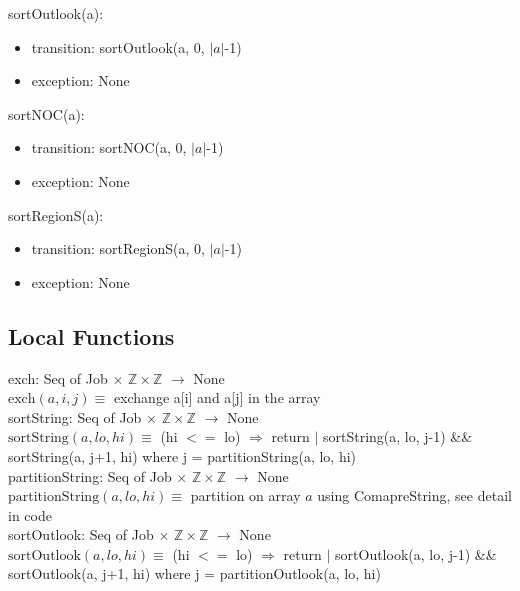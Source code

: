 \documentclass[12pt]{article}
\begin{document}
\noindent sortOutlook(a):
\begin{itemize}
\item transition: sortOutlook(a, 0, $|a|$-1)
\item exception: None
\end{itemize}

\noindent sortNOC(a):
\begin{itemize}
\item transition: sortNOC(a, 0, $|a|$-1)
\item exception: None
\end{itemize}

\noindent sortRegionS(a):
\begin{itemize}
\item transition: sortRegionS(a, 0, $|a|$-1)
\item exception: None
\end{itemize}

\subsection*{Local Functions}

\noindent exch: Seq of Job $\times$ $\mathbb{Z} \times \mathbb{Z}$  $ \rightarrow $ None\\
\noindent $\mbox{exch}(a, i, j) \equiv$ exchange a[i] and a[j] in the array\\

\noindent sortString: Seq of Job $\times$ $\mathbb{Z} \times \mathbb{Z}$ $ \rightarrow $ None\\
\noindent $\mbox{sortString}(a, lo, hi) \equiv$ (hi $<=$ lo) $\Rightarrow$ return $|$ sortString(a, lo, j-1) \&\& sortString(a, j+1, hi) where j = partitionString(a, lo, hi)\\

\noindent partitionString: Seq of Job $\times$ $\mathbb{Z} \times \mathbb{Z}$ $ \rightarrow $ None\\
\noindent $\mbox{partitionString}(a, lo, hi) \equiv$ partition on array $a$ using ComapreString, see detail in code\\

\noindent sortOutlook: Seq of Job $\times$ $\mathbb{Z} \times \mathbb{Z}$ $ \rightarrow $ None\\
\noindent $\mbox{sortOutlook}(a, lo, hi) \equiv$ (hi $<=$ lo) $\Rightarrow$ return $|$ sortOutlook(a, lo, j-1) \&\& sortOutlook(a, j+1, hi) where j = partitionOutlook(a, lo, hi)\\
\end{document}
